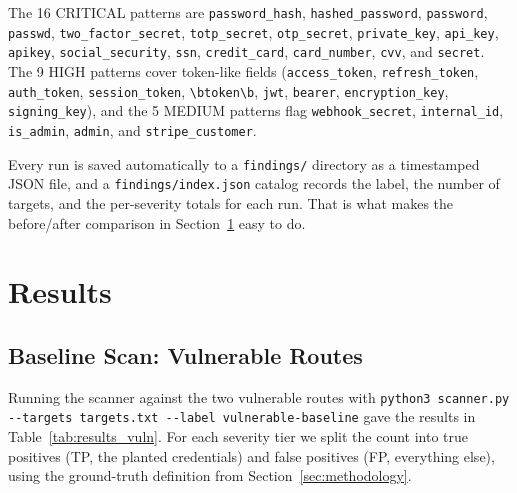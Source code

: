 \documentclass[runningheads]{llncs}
\begin{document}
The 16 CRITICAL
patterns are \texttt{password\_hash}, \texttt{hashed\_password},
\texttt{password}, \texttt{passwd}, \texttt{two\_factor\_secret},
\texttt{totp\_secret}, \texttt{otp\_secret}, \texttt{private\_key},
\texttt{api\_key}, \texttt{apikey}, \texttt{social\_security},
\texttt{ssn}, \texttt{credit\_card}, \texttt{card\_number},
\texttt{cvv}, and \texttt{secret}.  The 9 HIGH patterns cover token-like
fields (\texttt{access\_token}, \texttt{refresh\_token},
\texttt{auth\_token}, \texttt{session\_token},
\texttt{\textbackslash btoken\textbackslash b}, \texttt{jwt},
\texttt{bearer}, \texttt{encryption\_key}, \texttt{signing\_key}), and
the 5 MEDIUM patterns flag \texttt{webhook\_secret},
\texttt{internal\_id}, \texttt{is\_admin}, \texttt{admin}, and
\texttt{stripe\_customer}.

Every run is saved automatically to a \texttt{findings/} directory as a
timestamped JSON file, and a \texttt{findings/index.json} catalog records
the label, the number of targets, and the per-severity totals for each
run.  That is what makes the before/after comparison in
Section~\ref{sec:results} easy to do.

\section{Results}
\label{sec:results}

\subsection{Baseline Scan: Vulnerable Routes}

Running the scanner against the two vulnerable routes with
\texttt{python3 scanner.py -{}-targets targets.txt -{}-label
vulnerable-baseline} gave the results in Table~\ref{tab:results_vuln}.
For each severity tier we split the count into true positives (TP, the
planted credentials) and false positives (FP, everything else), using the
ground-truth definition from Section~\ref{sec:methodology}.
\end{document}
